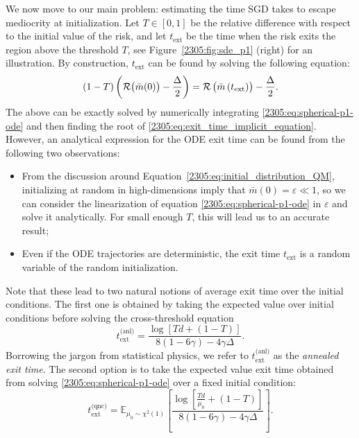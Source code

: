We now move to our main problem: estimating the time SGD takes to escape mediocrity at initialization. Let $T\in[0,1]$ be the relative difference with respect to the initial value of the risk, and let \(t_\text{ext}\) be the time when the risk exits the region above the threshold \(T\), see Figure~\ref{2305:fig:sde_p1} (right) for an illustration. By construction, \(t_\text{ext}\) can be found by solving the following equation:
\begin{equation} \label{2305:eq:exit_time_implicit_equation}
  (1-T)\left(\mathcal{R}{\left(\bar{m}(0)\right)}-\frac{\Delta}{2}\right) = \mathcal{R}\left({\bar{m}\left(t_\text{ext}\right)}\right)-\frac{\Delta}{2}.
\end{equation}
The above can be exactly solved by numerically integrating \eqref{2305:eq:spherical-p1-ode} and then finding the root of \eqref{2305:eq:exit_time_implicit_equation}. However, an analytical expression for the ODE exit time can be found from the following two observations:
\begin{itemize}
    \item From the discussion around Equation~\eqref{2305:eq:initial_distribution_QM}, initializing at random in high-dimensions imply that \(\bar{m}(0)=\varepsilon \ll 1\), so we can consider the linearization of equation \eqref{2305:eq:spherical-p1-ode} in $\varepsilon$ and solve it analytically. For small enough \(T\), this will lead us to an accurate result;
    \item Even if the ODE trajectories are deterministic, the exit time \(t_\text{ext}\) is a random variable of the random initialization.
\end{itemize}
Note that these lead to two natural notions of average exit time over the initial conditions. The first one is obtained by taking the expected value over initial conditions before solving the cross-threshold equation
\begin{equation}\label{2305:eq:exit_time_p1}
    t_\text{ext}^\text{(anl)} = \frac{\log\left[Td+(1-T)\right]}{8(1-6\gamma)-4\gamma\Delta}.
\end{equation}
Borrowing the jargon from statistical physics, we refer to $t_\text{ext}^\text{(anl)}$ as the \emph{annealed exit time}. The second option is to take the expected value exit time obtained from solving \eqref{2305:eq:spherical-p1-ode} over a fixed initial condition:
\begin{equation}
\label{2305:eq:exit:quenched}
    t_\text{ext}^\text{(qnc)} = \mathbb E_{\mu_0 \sim \chi^2(1)} \left[
        \frac{\log\left[\frac{Td}{\mu_0}+(1-T)\right]}{8(1-6\gamma)-4\gamma\Delta}
    \right].
\end{equation}
